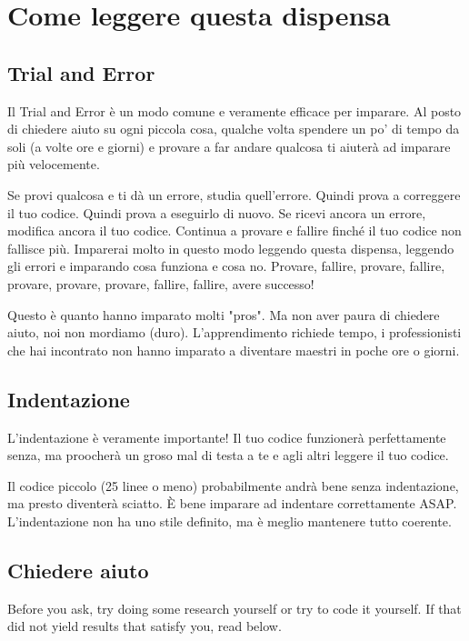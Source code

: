 \section*{Come leggere questa dispensa}

\subsection*{Trial and Error}

Il Trial and Error è un modo comune e veramente efficace per imparare. Al posto di chiedere aiuto su ogni piccola cosa, qualche volta spendere un po' di tempo da soli (a volte ore e giorni) e provare a far andare qualcosa ti aiuterà ad imparare più velocemente.

Se provi qualcosa e ti dà un errore, studia quell'errore. Quindi prova a correggere il tuo codice. Quindi prova a eseguirlo di nuovo. Se ricevi ancora un errore, modifica ancora il tuo codice. Continua a provare e fallire finché il tuo codice non fallisce più. Imparerai molto in questo modo leggendo questa dispensa, leggendo gli errori e imparando cosa funziona e cosa no. Provare, fallire, provare, fallire, provare, provare, provare, fallire, fallire, avere successo!

Questo è quanto hanno imparato molti "pros". Ma non aver paura di chiedere aiuto, noi non mordiamo (duro). L'apprendimento richiede tempo, i professionisti che hai incontrato non hanno imparato a diventare maestri in poche ore o giorni.

\subsection*{Indentazione}

L'indentazione è veramente importante! Il tuo codice funzionerà perfettamente senza, ma proocherà un groso mal di testa a te e agli altri leggere il tuo codice.

Il codice piccolo (25 linee o meno) probabilmente andrà bene senza indentazione, ma presto diventerà sciatto. È bene imparare ad indentare correttamente ASAP. L'indentazione non ha uno stile definito, ma è meglio mantenere tutto coerente.

\subsection*{Chiedere aiuto}

Before you ask, try doing some research yourself or try to code it yourself. If that did not yield results that satisfy you, read below.

